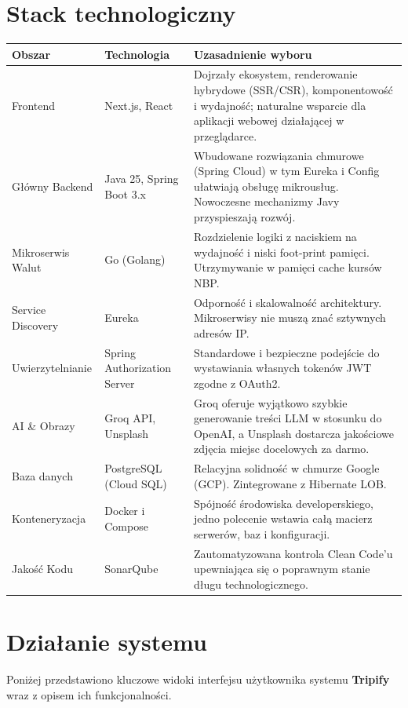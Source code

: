 \documentclass[11pt,a4paper]{article}
\newcommand{\sysname}{\textbf{Tripify}}
\begin{document}
\section{Stack technologiczny}
\begin{longtable}{p{} p{} p{}}
\toprule
\textbf{Obszar} & \textbf{Technologia} & \textbf{Uzasadnienie wyboru} \\
\midrule
\endhead
Frontend & Next.js, React & Dojrzały ekosystem, renderowanie hybrydowe
(SSR/CSR), komponentowość i wydajność;
naturalne wsparcie dla aplikacji webowej
działającej w przeglądarce. \\
\addlinespace
Główny Backend & Java 25, Spring Boot 3.x & Wbudowane rozwiązania chmurowe (Spring Cloud) w tym Eureka i Config ułatwiają obsługę mikrousług. Nowoczesne mechanizmy Javy przyspieszają rozwój. \\
\addlinespace
Mikroserwis Walut & Go (Golang) & Rozdzielenie logiki z naciskiem na wydajność i niski foot-print pamięci. Utrzymywanie w pamięci cache kursów NBP. \\
\addlinespace
Service Discovery & Eureka & Odporność i skalowalność architektury. Mikroserwisy nie muszą znać sztywnych adresów IP. \\
\addlinespace
Uwierzytelnianie & Spring Authorization Server & Standardowe i bezpieczne podejście do wystawiania własnych tokenów JWT zgodne z OAuth2. \\
\addlinespace
AI \& Obrazy & Groq API, Unsplash & Groq oferuje wyjątkowo szybkie generowanie treści LLM w stosunku do OpenAI, a Unsplash dostarcza jakościowe zdjęcia miejsc docelowych za darmo. \\
\addlinespace
Baza danych & PostgreSQL (Cloud SQL) & Relacyjna solidność w chmurze Google (GCP). Zintegrowane z Hibernate LOB. \\
\addlinespace
Konteneryzacja & Docker i Compose & Spójność środowiska developerskiego, jedno polecenie wstawia całą macierz serwerów, baz i konfiguracji. \\
\addlinespace
Jakość Kodu & SonarQube & Zautomatyzowana kontrola Clean Code'u upewniająca się o poprawnym stanie długu technologicznego. \\
\bottomrule
\end{longtable}

\section{Działanie systemu}
Poniżej przedstawiono kluczowe widoki interfejsu użytkownika systemu \sysname{} wraz z opisem ich funkcjonalności.
\end{document}
